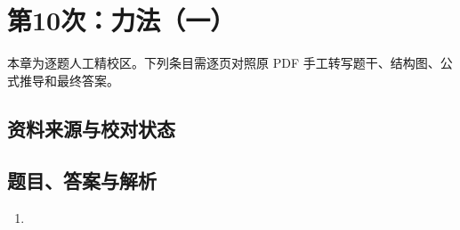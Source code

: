 \chapter{第10次：力法（一）}

本章为逐题人工精校区。下列条目需逐页对照原 PDF 手工转写题干、结构图、公式推导和最终答案。

\section{资料来源与校对状态}


\section{题目、答案与解析}

\begin{enumerate}[label=\textbf{第\arabic*题},wide]
  \item
  \begin{problemBox}
  \end{problemBox}

  \begin{solutionBox}
  \end{solutionBox}
\end{enumerate}
